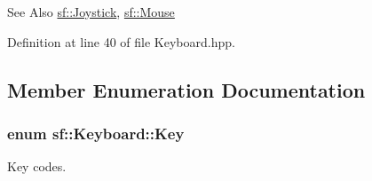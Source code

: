 \begin{DoxySeeAlso}{See Also}
\hyperlink{classsf_1_1_joystick}{sf\-::\-Joystick}, \hyperlink{classsf_1_1_mouse}{sf\-::\-Mouse} 
\end{DoxySeeAlso}


Definition at line 40 of file Keyboard.\-hpp.



\subsection{Member Enumeration Documentation}
\hypertarget{classsf_1_1_keyboard_acb4cacd7cc5802dec45724cf3314a142}{
\subsubsection[{Key}]{\setlength{\rightskip}{0pt plus 5cm}enum {\bf sf\-::\-Keyboard\-::\-Key}}}\label{classsf_1_1_keyboard_acb4cacd7cc5802dec45724cf3314a142}


Key codes. 

